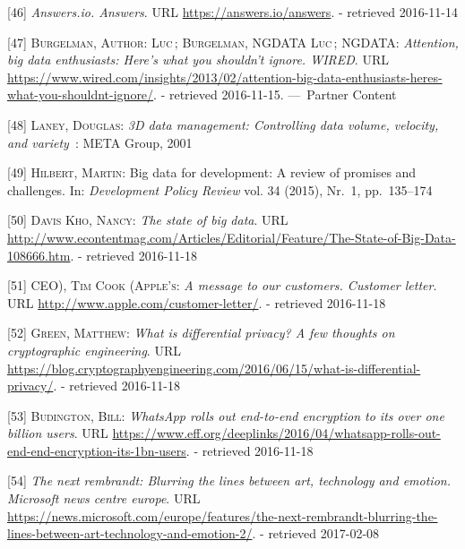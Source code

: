 \documentclass[12pt,english,a4paper,titlepage,cleardoublepage=empty,dottedtoc]{report}
\begin{document}
\hypertarget{ref-web_2016_answers-io}{}
{[}46{]} \emph{Answers.io. Answers}. URL
\url{https://answers.io/answers}. - retrieved 2016-11-14

\hypertarget{ref-web_2016_big-data-enthusiasts-should-not-ignore}{}
{[}47{]} \textsc{Burgelman, Author: Luc}\,; \textsc{Burgelman, NGDATA
Luc}\,; \textsc{NGDATA}: \emph{Attention, big data enthusiasts: Here's
what you shouldn't ignore. WIRED}. URL
\url{https://www.wired.com/insights/2013/02/attention-big-data-enthusiasts-heres-what-you-shouldnt-ignore/}.
- retrieved 2016-11-15. ---~Partner Content

\hypertarget{ref-report_2001_3d-data-management-controlling-data-volume-velocity-and-variety}{}
{[}48{]} \textsc{Laney, Douglas}: \emph{3D data management: Controlling
data volume, velocity, and variety}~: META Group, 2001

\hypertarget{ref-paper_2015_big-data-for-development-a-review-of-promises-and-challenges:more-data}{}
{[}49{]} \textsc{Hilbert, Martin}: Big data for development: A review of
promises and challenges. In: \emph{Development Policy Review} vol. 34
(2015), Nr.~1, pp.~135--174

\hypertarget{ref-web_2016_the-state-of-big-data}{}
{[}50{]} \textsc{Davis Kho, Nancy}: \emph{The state of big data}. URL
\url{http://www.econtentmag.com/Articles/Editorial/Feature/The-State-of-Big-Data-108666.htm}.
- retrieved 2016-11-18

\hypertarget{ref-web_2016_apple_customer-letter}{}
{[}51{]} \textsc{CEO), Tim Cook (Apple's}: \emph{A message to our
customers. Customer letter}. URL
\url{http://www.apple.com/customer-letter/}. - retrieved 2016-11-18

\hypertarget{ref-web_2016_what-is-differential-privacy}{}
{[}52{]} \textsc{Green, Matthew}: \emph{What is differential privacy? A
few thoughts on cryptographic engineering}. URL
\url{https://blog.cryptographyengineering.com/2016/06/15/what-is-differential-privacy/}.
- retrieved 2016-11-18

\hypertarget{ref-web_2016_eff_whatsapp-rolls-out-emd-to-end-encryption}{}
{[}53{]} \textsc{Budington, Bill}: \emph{WhatsApp rolls out end-to-end
encryption to its over one billion users}. URL
\url{https://www.eff.org/deeplinks/2016/04/whatsapp-rolls-out-end-end-encryption-its-1bn-users}.
- retrieved 2016-11-18

\hypertarget{ref-web_2016_research-experiment_ai-rembrandt}{}
{[}54{]} \emph{The next rembrandt: Blurring the lines between art,
technology and emotion. Microsoft news centre europe}. URL
\url{https://news.microsoft.com/europe/features/the-next-rembrandt-blurring-the-lines-between-art-technology-and-emotion-2/}.
- retrieved 2017-02-08
\end{document}
